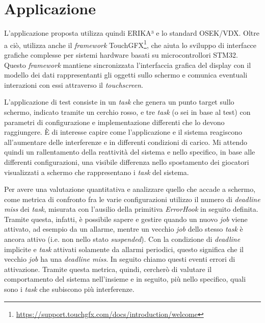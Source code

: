 \documentclass{article}
\begin{document}
\section{Applicazione}
L'applicazione proposta utilizza quindi ERIKA³ e lo standard OSEK/VDX. Oltre a ciò, utilizza anche il \textit{framework} TouchGFX\footnote{\url{https://support.touchgfx.com/docs/introduction/welcome}}, che aiuta lo sviluppo di interfacce grafiche complesse per sistemi hardware basati su microcontrollori STM32. Questo \textit{framework} mantiene sincronizzata l'interfaccia grafica del display con il modello dei dati rappresentanti gli oggetti sullo schermo e comunica eventuali interazioni con essi attraverso il \textit{touchscreen}.

L'applicazione di test consiste in un \textit{task} che genera un punto target sullo schermo, indicato tramite un cerchio rosso, e tre \textit{task} (o sei in base al test) con parametri di configurazione e implementazione differenti che lo devono raggiungere.
È di interesse capire come l'applicazione e il sistema reagiscono all'aumentare delle interferenze e in differenti condizioni di carico. Mi attendo quindi un rallentamento della reattività del sistema e nello specifico, in base alle differenti configurazioni, una visibile differenza nello spostamento dei giocatori visualizzati a schermo che rappresentano i \textit{task} del sistema.

Per avere una valutazione quantitativa e analizzare quello che accade a schermo, come metrica di confronto fra le varie configurazioni utilizzo il numero di \textit{deadline miss} dei \textit{task}, misurata con l'ausilio della primitiva \textit{ErrorHook} in seguito definita. Tramite questa, infatti, è possibile sapere e gestire quando un nuovo \textit{job} viene attivato, ad esempio da un allarme, mentre un vecchio \textit{job} dello stesso \textit{task} è ancora attivo (i.e. non nello stato \textit{suspended}). Con la condizione di \textit{deadline} implicite e \textit{task} attivati solamente da allarmi periodici, questo significa che il vecchio \textit{job} ha una \textit{deadline miss}. In seguito chiamo questi eventi errori di attivazione. 
Tramite questa metrica, quindi, cercherò di valutare il comportamento del sistema nell'insieme e in seguito, più nello specifico, quali sono i \textit{task} che subiscono più interferenze.
\end{document}
